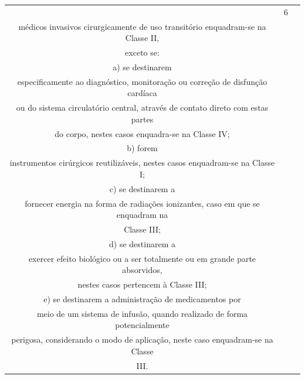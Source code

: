 {{\begin{longtable}{|c|c|l|}
                                  & 6              & \begin{tabular}[c]{@{}l@{}}Todos os produtos\\ médicos invasivos cirurgicamente de uso transitório enquadram-se na Classe II,\\ exceto se:\\ a) se destinarem\\ especificamente ao diagnóstico, monitoração ou correção de disfunção cardíaca\\ ou do sistema circulatório central, através de contato direto com estas partes\\ do corpo, nestes casos enquadra-se na Classe IV;\\ b) forem\\ instrumentos cirúrgicos reutilizáveis, nestes casos enquadram-se na Classe I;\\ c) se destinarem a\\ fornecer energia na forma de radiações ionizantes, caso em que se enquadram na\\ Classe III;\\ d) se destinarem a\\ exercer efeito biológico ou a ser totalmente ou em grande parte absorvidos,\\ nestes casos pertencem à Classe III;\\ e) se destinarem a administração de medicamentos por\\ meio de um sistema de infusão, quando realizado de forma potencialmente\\ perigosa, considerando o modo de aplicação, neste caso enquadram-se na Classe\\ III.\end{tabular}                                                                                                                                                        \\ \cline{2-3} 

\end{longtable}}}
